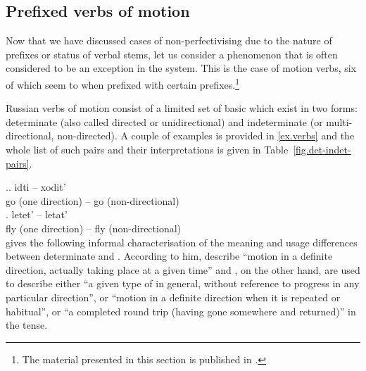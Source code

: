 \subsection{Prefixed verbs of motion}\label{subsection:perf:motion}

Now that we have discussed cases of non-perfectivising  due to the nature of prefixes or  status of verbal stems, let us consider a phenomenon that is often considered to be an exception in the  system. This is the case of motion verbs, six of which seem to  when prefixed with certain prefixes.\footnote{The material presented in this section is published in \cite{ZinovaOsswald:paper}.}

Russian verbs of motion consist of a limited set of basic  which exist in two forms: determinate (also called directed or unidirectional) and indeterminate (or multi-directional, non-directed). A couple of examples is provided in \ref{ex.verbs} and the whole list of such pairs and their interpretations is given in Table~\ref{fig.det-indet-pairs}.

\ex.\label{ex.verbs}\ag. idti -- xodit'\\
{go (one direction)} -- {go (non-directional)}\\
\bg. letet' -- letat'\\
{fly (one direction)} -- {fly (non-directional)}\\

\citet[3f]{Stilman:51} gives the following informal characterisation of the meaning and usage differences between determinate and . According to him,  describe ``motion in a definite direction, actually taking place at a given time'' and , on the other hand, are used to describe either ``a given type of  in general, without reference to progress in any particular direction'', or ``motion in a definite direction when it is repeated or habitual'', or ``a completed round trip (having gone somewhere and returned)'' in the  tense.

